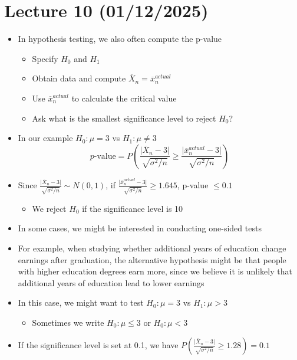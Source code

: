 \documentclass{article}
\begin{document}
\section{Lecture 10 (01/12/2025)}
\begin{itemize}
    \item In hypothesis testing, we also often compute the p-value
    \begin{itemize}
        \item Specify $H_0$ and $H_1$
        \item Obtain data and compute $\overline{X}_n = \overline{x}_n^{actual}$
        \item Use $\overline{x}_n^{actual}$ to calculate the critical value
        \item Ask what is the smallest significance level to reject $H_0$?
    \end{itemize}
    \item In our example $H_0: \mu = 3$ vs $H_1: \mu \neq 3$
    \[
    p\text{-value} = P\left( \frac{\vert \overline{X}_n - 3 \vert}{\sqrt{\sigma^2 / n}} \ge \frac{\vert \overline{x}_n^{actual} - 3 \vert}{\sqrt{\sigma^2 / n}} \right)
    \]
    \item Since $\frac{\vert \overline{X}_n - 3\vert}{\sqrt{\sigma^2 /n}} \sim N(0,1)$, if $\frac{\vert \overline{x}_n^{actual} - 3 \vert}{\sqrt{\sigma^2 / n}} \ge 1.645$, p-value $\le 0.1$
    \begin{itemize}
        \item We reject $H_0$ if the significance level is 10%
    \end{itemize}
    \item In some cases, we might be interested in conducting one-sided tests
    \item For example, when studying whether additional years of education change earnings after graduation, the alternative hypothesis might be that people with higher education degrees earn more, since we believe it is unlikely that additional years of education lead to lower earnings
    \item In this case, we might want to test $H_0: \mu = 3$ vs $H_1: \mu > 3$
    \begin{itemize}
        \item Sometimes we write $H_0: \mu \le 3$ or $H_0: \mu < 3$
    \end{itemize}
    \item If the significance level is set at 0.1, we have $P \left( \frac{\vert \overline{X}_n - 3\vert}{\sqrt{\sigma^2 /n}} \ge 1.28 \right) = 0.1$

\end{itemize}
\end{document}
